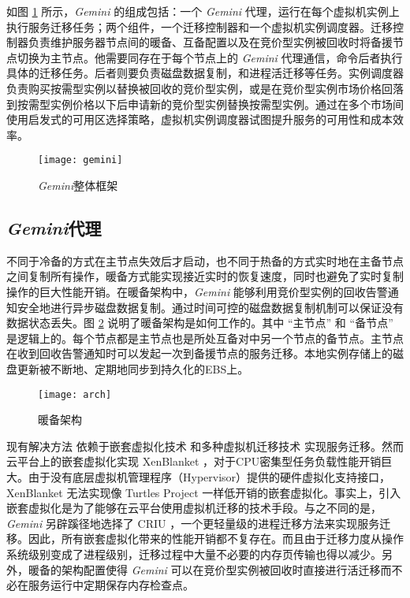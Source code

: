 如图 \ref{figure:gemini} 所示，\emph{Gemini} 的组成包括：一个 \emph{Gemini} 代理，运行在每个虚拟机实例上执行服务迁移任务；两个组件，一个迁移控制器和一个虚拟机实例调度器。迁移控制器负责维护服务器节点间的暖备、互备配置以及在竞价型实例被回收时将备援节点切换为主节点。他需要同存在于每个节点上的 \emph{Gemini} 代理通信，命令后者执行具体的迁移任务。后者则要负责磁盘数据复制，和进程活迁移等任务。实例调度器负责购买按需型实例以替换被回收的竞价型实例，或是在竞价型实例市场价格回落到按需型实例价格以下后申请新的竞价型实例替换按需型实例。通过在多个市场间使用启发式的可用区选择策略，虚拟机实例调度器试图提升服务的可用性和成本效率。
\begin{figure}
  \centering
  \texttt{[image: gemini]}
  \caption{\emph{Gemini}整体框架}
  \label{figure:gemini}
\end{figure}

\subsection{\emph{Gemini}代理}
不同于冷备的方式在主节点失效后才启动，也不同于热备的方式实时地在主备节点之间复制所有操作，暖备方式能实现接近实时的恢复速度，同时也避免了实时复制操作的巨大性能开销。在暖备架构中，\emph{Gemini} 能够利用竞价型实例的回收告警通知安全地进行异步磁盘数据复制。通过时间可控的磁盘数据复制机制可以保证没有数据状态丢失。图 \ref{figure:arch} 说明了暖备架构是如何工作的。其中 ``主节点'' 和 ``备节点'' 是逻辑上的。每个节点都是主节点也是所处互备对中另一个节点的备节点。主节点在收到回收告警通知时可以发起一次到备援节点的服务迁移。本地实例存储上的磁盘更新被不断地、定期地同步到持久化的EBS上。
\begin{figure}
  \centering
  \texttt{[image: arch]}
  \caption{暖备架构}
  \label{figure:arch}
\end{figure}

现有解决方法 \cite{He:2015:CCH:2749246.2749275} 依赖于嵌套虚拟化技术 \cite{Williams:2012:XVO:2168836.2168849} 和多种虚拟机迁移技术 \cite{Singh:2013:YEG:2482626.2482642, Hines:2009:PBL:1508293.1508301} 实现服务迁移。然而云平台上的嵌套虚拟化实现 XenBlanket \cite{Williams:2012:XVO:2168836.2168849}，对于CPU密集型任务负载性能开销巨大。由于没有底层虚拟机管理程序（Hypervisor）提供的硬件虚拟化支持接口，XenBlanket 无法实现像 Turtles Project \cite{Ben-Yehuda:2010:TPD:1924943.1924973} 一样低开销的嵌套虚拟化。事实上，引入嵌套虚拟化是为了能够在云平台使用虚拟机迁移的技术手段。与之不同的是，\emph{Gemini} 另辟蹊径地选择了 CRIU \cite{CRIU:2016}，一个更轻量级的进程迁移方法来实现服务迁移。因此，所有嵌套虚拟化带来的性能开销都不复存在。而且由于迁移力度从操作系统级别变成了进程级别，迁移过程中大量不必要的内存页传输也得以减少。另外，暖备的架构配置使得 \emph{Gemini} 可以在竞价型实例被回收时直接进行活迁移而不必在服务运行中定期保存内存检查点。

